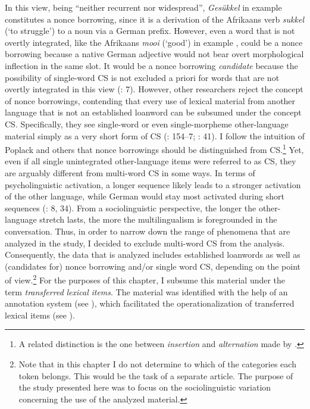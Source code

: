 \documentclass[output=paper]{langsci/langscibook}
\begin{document}
In this view, being “neither recurrent nor widespread”, \textit{Gesükkel} in example  constitutes a nonce borrowing, since it is a derivation of the Afrikaans verb \textit{sukkel} (‘to struggle’) to a noun via a German prefix. However, even a word that is not overtly integrated, like the Afrikaans \textit{mooi} (‘good’) in example , could be a nonce borrowing because a native German adjective would not bear overt morphological inflection in the same slot. It would be a nonce borrowing \textit{candidate} because the possibility of single-word CS is not excluded a priori for words that are not overtly integrated in this view (\citealt{poplack_social_1988}: 7). However, other researchers reject the concept of nonce borrowings, contending that every use of lexical material from another language that is not an established loanword can be subsumed under the concept CS. Specifically, they see single-word or even single-morpheme other-language material simply as a very short form of CS (\citealt{myers-scotton_contact_2002}: 154–7; \citealt{haspelmath_lexical_2009}: 41). I follow the intuition of Poplack and others that nonce borrowings should be distinguished from CS.\footnote{A related distinction is the one between \textit{insertion} and \textit{alternation} made by \citet{muysken_bilingual_2000}.} Yet, even if all single unintegrated other-language items were referred to as CS, they are arguably different from multi-word CS in some ways. In terms of psycholinguistic activation, a longer sequence likely leads to a stronger activation of the other language, while German would stay most activated during short sequences (\citealt{muysken_bilingual_2000}: 8, 34). From a sociolinguistic perspective, the longer the other-language stretch lasts, the more the multilingualism is foregrounded in the conversation. Thus, in order to narrow down the range of phenomena that are analyzed in the study, I decided to exclude multi-word CS from the analysis. Consequently, the data that is analyzed includes established loanwords as well as (candidates for) nonce borrowing and/or single word CS, depending on the point of view.\footnote{Note that in this chapter I do not determine to which of the categories each token belongs. This would be the task of a separate article. The purpose of the study presented here was to focus on the sociolinguistic variation concerning the use of the analyzed material.} For the purposes of this chapter, I subsume this material under the term \textit{transferred} \textit{lexical} \textit{items}. The material was identified with the help of an annotation system (see ), which facilitated the operationalization of transferred lexical items (see ).
\end{document}
